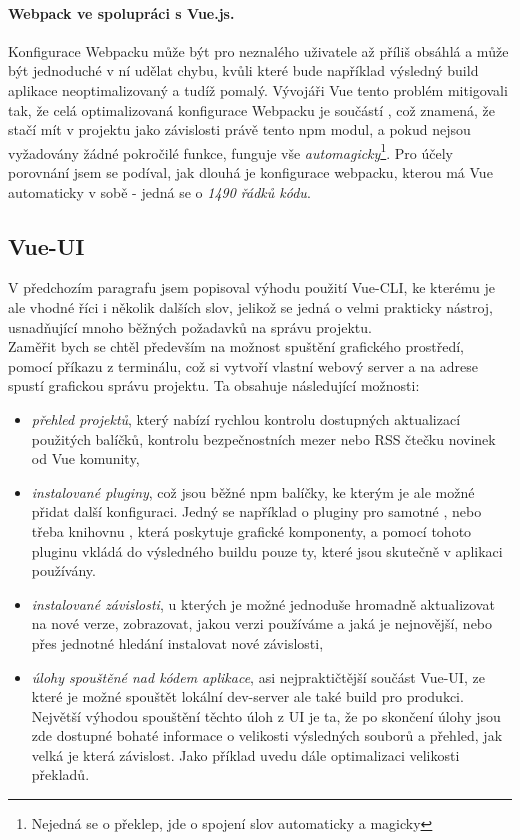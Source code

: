 \paragraph{Webpack ve spolupráci s Vue.js.} Konfigurace Webpacku může být pro neznalého uživatele až příliš obsáhlá a může být jednoduché v ní udělat chybu, kvůli které bude například výsledný build aplikace neoptimalizovaný a tudíž pomalý. Vývojáři Vue tento problém mitigovali tak, že celá optimalizovaná konfigurace Webpacku je součástí , což znamená, že stačí mít v projektu jako závislosti právě tento npm modul, a pokud nejsou vyžadovány žádné pokročilé funkce, funguje vše \emph{automagicky}\footnote{Nejedná se o překlep, jde o spojení slov automaticky a magicky}. Pro účely porovnání jsem se podíval, jak dlouhá je konfigurace webpacku, kterou má Vue automaticky v sobě - jedná se o \emph{1490 řádků kódu}.


\subsection{Vue-UI}

V předchozím paragrafu jsem popisoval výhodu použití Vue-CLI, ke kterému je ale vhodné říci i několik dalších slov, jelikož se jedná o velmi prakticky nástroj, usnadňující mnoho běžných požadavků na správu projektu.\\
Zaměřit bych se chtěl především na možnost spuštění grafického prostředí, pomocí příkazu  z terminálu, což si vytvoří vlastní webový server a na adrese  spustí grafickou správu projektu. Ta obsahuje následující možnosti:
\begin{itemize}
    \item \emph{přehled projektů}, který nabízí rychlou kontrolu dostupných aktualizací použitých balíčků, kontrolu bezpečnostních mezer nebo RSS čtečku novinek od Vue komunity,
    \item \emph{instalované pluginy}, což jsou běžné npm balíčky, ke kterým je ale možné přidat další konfiguraci. Jedný se například o pluginy pro samotné ,  nebo třeba knihovnu , která poskytuje grafické komponenty, a pomocí tohoto pluginu vkládá do výsledného buildu pouze ty, které jsou skutečně v aplikaci používány.
    \item \emph{instalované závislosti}, u kterých je možné jednoduše hromadně aktualizovat na nové verze, zobrazovat, jakou verzi používáme a jaká je nejnovější, nebo přes jednotné hledání instalovat nové závislosti,
    \item \emph{úlohy spouštěné nad kódem aplikace}, asi nejpraktičtější součást Vue-UI, ze které je možné spouštět lokální dev-server ale také build pro produkci. Největší výhodou spouštění těchto úloh z UI je ta, že po skončení úlohy jsou zde dostupné bohaté informace o velikosti výsledných souborů a přehled, jak velká je která závislost. Jako příklad uvedu dále optimalizaci velikosti překladů.
\end{itemize}

